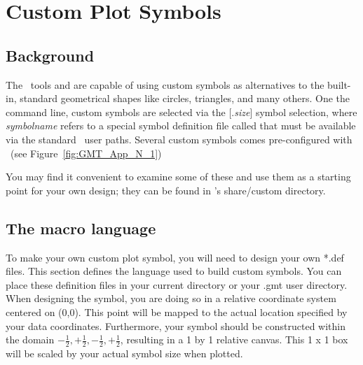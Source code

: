 %
%
\chapter{Custom Plot Symbols}
\label{app:N}
\thispagestyle{headings}

\section{Background}

The \GMT\ tools  and  are capable of using
custom symbols as alternatives to the built-in, standard geometrical shapes
like circles, triangles, and many others.  One the command line, custom
symbols are selected via the [.{\it size}] symbol
selection, where {\it symbolname} refers to a special symbol definition
file called  that must be available via the standard
\GMT\ user paths.  Several custom symbols comes pre-configured with \GMT\
(see Figure~\ref{fig:GMT_App_N_1})


You may find it convenient to examine some of these and use them as a starting
point for your own design; they can be found in \GMT's share/custom directory.

% 
\section{The macro language}

To make your own custom plot symbol, you will need to design your own *.def files.
This section defines the language used to build custom symbols.  You can place these
definition files in your current directory or your .gmt user directory.  When designing
the symbol, you are doing so in a relative coordinate system centered on (0,0).  This point
will be mapped to the actual location specified by your data coordinates.  Furthermore,
your symbol should be constructed within the domain ${-\frac{1}{2},+\frac{1}{2},-\frac{1}{2},+\frac{1}{2}}$,
resulting in a 1 by 1 relative canvas.  This 1 x 1 box will be scaled by your actual
symbol size when plotted.

